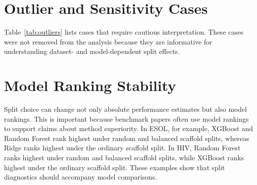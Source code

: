 \appendix

\section{Outlier and Sensitivity Cases}
\label{app:outliers}

Table~\ref{tab:outliers} lists cases that require cautious interpretation. These cases were not removed from the analysis because they are informative for understanding dataset- and model-dependent split effects.

\begin{table}[H]
\centering
\caption{Outlier and sensitivity cases identified during the split-diagnostic audit.}
\label{tab:outliers}
\end{table}

\section{Model Ranking Stability}
\label{app:rankings}

Split choice can change not only absolute performance estimates but also model rankings. This is important because benchmark papers often use model rankings to support claims about method superiority. In ESOL, for example, XGBoost and Random Forest rank highest under random and balanced scaffold splits, whereas Ridge ranks highest under the ordinary scaffold split. In HIV, Random Forest ranks highest under random and balanced scaffold splits, while XGBoost ranks highest under the ordinary scaffold split. These examples show that split diagnostics should accompany model comparisons.

